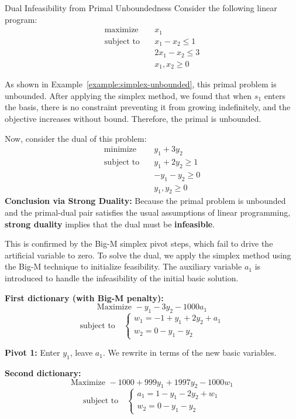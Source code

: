 \begin{example}{Dual Infeasibility from Primal Unboundedness}{}\label{example:simplex-unbounded}
Consider the following linear program:
\[
\begin{aligned}
\text{maximize} \quad & x_1 \\
\text{subject to} \quad
& x_1 - x_2 \leq 1 \\
& 2x_1 - x_2 \leq 3 \\
& x_1, x_2 \geq 0
\end{aligned}
\]

As shown in Example~\ref{example:simplex-unbounded}, this primal problem is unbounded. After applying the simplex method, we found that when \( s_1 \) enters the basis, there is no constraint preventing it from growing indefinitely, and the objective increases without bound. Therefore, the primal is unbounded.

Now, consider the dual of this problem:
\[
\begin{aligned}
\text{minimize} \quad & y_1 + 3y_2 \\
\text{subject to} \quad
& y_1 + 2y_2 \geq 1 \\
& -y_1 - y_2 \geq 0 \\
& y_1, y_2 \geq 0
\end{aligned}
\]
\textbf{Conclusion via Strong Duality:}  
Because the primal problem is unbounded and the primal-dual pair satisfies the usual assumptions of linear programming, \textbf{strong duality} implies that the dual must be \textbf{infeasible}. 


This is confirmed by the Big-M simplex pivot steps, which fail to drive the artificial variable to zero.
To solve the dual, we apply the simplex method using the Big-M technique to initialize feasibility. The auxiliary variable \( a_1 \) is introduced to handle the infeasibility of the initial basic solution.

\textbf{First dictionary (with Big-M penalty):}
\[
\text{Maximize } -y_1 - 3y_2 - 1000a_1
\]
\[
\text{subject to} \quad
\begin{cases}
w_1 = -1 + y_1 + 2y_2 + a_1 \\
w_2 = 0 - y_1 - y_2
\end{cases}
\]

\textbf{Pivot 1:} Enter \( y_1 \), leave \( a_1 \). We rewrite in terms of the new basic variables.

\textbf{Second dictionary:}
\[
\text{Maximize } -1000 + 999y_1 + 1997y_2 - 1000w_1
\]
\[
\text{subject to} \quad
\begin{cases}
a_1 = 1 - y_1 - 2y_2 + w_1 \\
w_2 = 0 - y_1 - y_2
\end{cases}
\]


\end{example}
